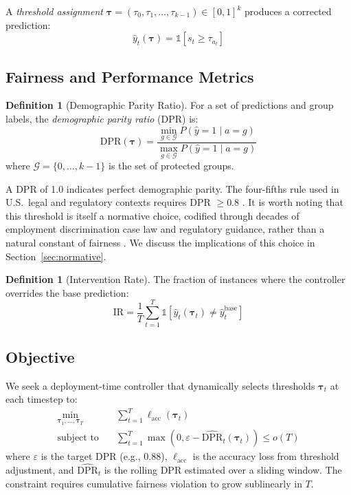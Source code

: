 \documentclass[letterpaper]{article} %
\theoremstyle{definition}
\newtheorem{definition}[theorem]{Definition}
\begin{document}
A \emph{threshold assignment} $\boldsymbol{\tau} = (\tau_0, \tau_1, \ldots, \tau_{k-1}) \in [0,1]^k$ produces a corrected prediction:
\begin{equation}
\hat{y}_t(\boldsymbol{\tau}) = \mathbb{1}[s_t \geq \tau_{a_t}]
\label{eq:threshold_pred}
\end{equation}

\subsection{Fairness and Performance Metrics}

\begin{definition}[Demographic Parity Ratio]
For a set of predictions and group labels, the \emph{demographic parity ratio} (DPR) is:
\begin{equation}
\text{DPR}(\boldsymbol{\tau}) = \frac{\min_{g \in \mathcal{G}} P(\hat{y}=1 \mid a=g)}{\max_{g \in \mathcal{G}} P(\hat{y}=1 \mid a=g)}
\label{eq:dpr}
\end{equation}
where $\mathcal{G} = \{0, \ldots, k{-}1\}$ is the set of protected groups.
\end{definition}

A DPR of 1.0 indicates perfect demographic parity. The four-fifths rule used in U.S.\ legal and regulatory contexts requires DPR $\geq 0.8$ \cite{biddle2006adverse}. It is worth noting that this threshold is itself a normative choice, codified through decades of employment discrimination case law and regulatory guidance, rather than a natural constant of fairness \cite{corbettdavies2018measure}. We discuss the implications of this choice in Section~\ref{sec:normative}.

\begin{definition}[Intervention Rate]
The fraction of instances where the controller overrides the base prediction:
\begin{equation}
\text{IR} = \frac{1}{T}\sum_{t=1}^T \mathbb{1}[\hat{y}_t(\boldsymbol{\tau}_t) \neq \hat{y}_t^{\text{base}}]
\end{equation}
\end{definition}

\subsection{Objective}
We seek a deployment-time controller that dynamically selects thresholds $\boldsymbol{\tau}_t$ at each timestep to:
\begin{equation}
\begin{aligned}
\min_{\boldsymbol{\tau}_1, \ldots, \boldsymbol{\tau}_T} \quad & \sum_{t=1}^T \ell_{\text{acc}}(\boldsymbol{\tau}_t) \\
\text{subject to} \quad & \sum_{t=1}^T \max(0, \varepsilon - \widehat{\text{DPR}}_t(\boldsymbol{\tau}_t)) \leq o(T)
\end{aligned}
\label{eq:objective}
\end{equation}
where $\varepsilon$ is the target DPR (e.g., 0.88), $\ell_{\text{acc}}$ is the accuracy loss from threshold adjustment, and $\widehat{\text{DPR}}_t$ is the rolling DPR estimated over a sliding window. The constraint requires cumulative fairness violation to grow sublinearly in $T$.
\end{document}
